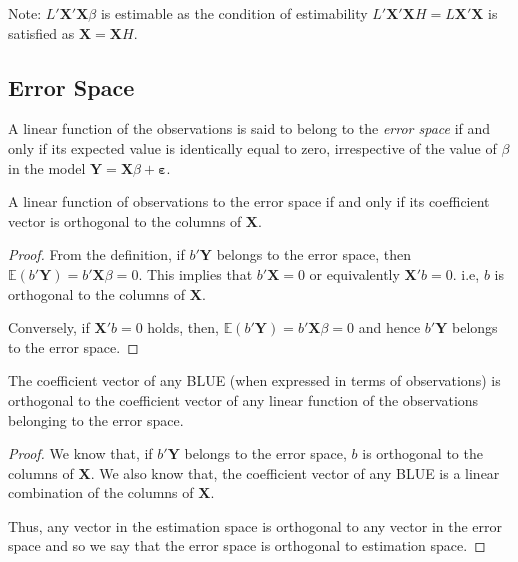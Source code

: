 \documentclass[10pt, a4paper]{article}
\begin{document}
Note: \( L'\mathbf{X}'\mathbf{X}\beta \) is estimable as the condition of estimability \( L'\mathbf{X}'\mathbf{X}H = L\mathbf{X}'\mathbf{X} \) is satisfied as \( \mathbf{X} = \mathbf{X}H \).

\subsection{Error Space}
\begin{definition}
A linear function of the observations is said to belong to the \textit{error space} if and only if its expected value is identically equal to zero, irrespective of the value of \( \beta \) in the model \( \mathbf{Y} = \mathbf{X}\beta + \mathbf{\varepsilon} \).
\end{definition}

\begin{theorem}\label{thm:err_ortho}
A linear function of observations to the error space if and only if its coefficient vector is orthogonal to the columns of \( \mathbf{X} \).
\end{theorem}

\begin{proof}
From the definition, if \( b'\mathbf{Y} \) belongs to the error space, then \( \mathbb{E}(b'\mathbf{Y}) = b'\mathbf{X}\beta = 0 \). This implies that \( b'\mathbf{X} = 0 \) or equivalently \( \mathbf{X}'b = 0 \). i.e, \( b \) is orthogonal to the columns of \( \mathbf{X} \).

Conversely, if \( \mathbf{X}'b = 0 \) holds, then, \( \mathbb{E}(b'\mathbf{Y}) = b'\mathbf{X}\beta = 0 \) and hence \( b'\mathbf{Y} \) belongs to the error space.
\end{proof}

\begin{theorem}
The coefficient vector of any BLUE (when expressed in terms of observations) is orthogonal to the coefficient vector of any linear function of the observations belonging to the error space.
\end{theorem}

\begin{proof}
We know that, if \( b'\mathbf{Y} \) belongs to the error space, \( b \) is orthogonal to the columns of \( \mathbf{X} \). We also know that, the coefficient vector of any BLUE is a linear combination of the columns of \( \mathbf{X} \).

Thus, any vector in the estimation space is orthogonal to any vector in the error space and so we say that the error space is orthogonal to estimation space.
\end{proof}
\end{document}
